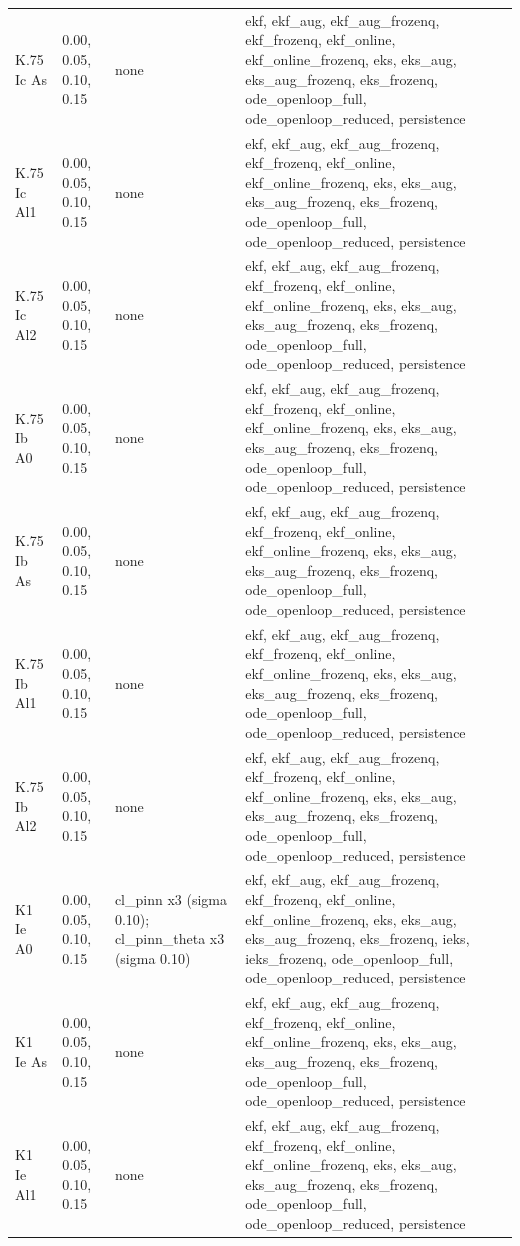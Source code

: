 \begin{table}[t]
\begin{tabular}{llll}
K.75 Ic As & 0.00, 0.05, 0.10, 0.15 & none & ekf, ekf\_aug, ekf\_aug\_frozenq, ekf\_frozenq, ekf\_online, ekf\_online\_frozenq, eks, eks\_aug, eks\_aug\_frozenq, eks\_frozenq, ode\_openloop\_full, ode\_openloop\_reduced, persistence \\
K.75 Ic Al1 & 0.00, 0.05, 0.10, 0.15 & none & ekf, ekf\_aug, ekf\_aug\_frozenq, ekf\_frozenq, ekf\_online, ekf\_online\_frozenq, eks, eks\_aug, eks\_aug\_frozenq, eks\_frozenq, ode\_openloop\_full, ode\_openloop\_reduced, persistence \\
K.75 Ic Al2 & 0.00, 0.05, 0.10, 0.15 & none & ekf, ekf\_aug, ekf\_aug\_frozenq, ekf\_frozenq, ekf\_online, ekf\_online\_frozenq, eks, eks\_aug, eks\_aug\_frozenq, eks\_frozenq, ode\_openloop\_full, ode\_openloop\_reduced, persistence \\
K.75 Ib A0 & 0.00, 0.05, 0.10, 0.15 & none & ekf, ekf\_aug, ekf\_aug\_frozenq, ekf\_frozenq, ekf\_online, ekf\_online\_frozenq, eks, eks\_aug, eks\_aug\_frozenq, eks\_frozenq, ode\_openloop\_full, ode\_openloop\_reduced, persistence \\
K.75 Ib As & 0.00, 0.05, 0.10, 0.15 & none & ekf, ekf\_aug, ekf\_aug\_frozenq, ekf\_frozenq, ekf\_online, ekf\_online\_frozenq, eks, eks\_aug, eks\_aug\_frozenq, eks\_frozenq, ode\_openloop\_full, ode\_openloop\_reduced, persistence \\
K.75 Ib Al1 & 0.00, 0.05, 0.10, 0.15 & none & ekf, ekf\_aug, ekf\_aug\_frozenq, ekf\_frozenq, ekf\_online, ekf\_online\_frozenq, eks, eks\_aug, eks\_aug\_frozenq, eks\_frozenq, ode\_openloop\_full, ode\_openloop\_reduced, persistence \\
K.75 Ib Al2 & 0.00, 0.05, 0.10, 0.15 & none & ekf, ekf\_aug, ekf\_aug\_frozenq, ekf\_frozenq, ekf\_online, ekf\_online\_frozenq, eks, eks\_aug, eks\_aug\_frozenq, eks\_frozenq, ode\_openloop\_full, ode\_openloop\_reduced, persistence \\
K1 Ie A0 & 0.00, 0.05, 0.10, 0.15 & cl\_pinn x3 (sigma 0.10); cl\_pinn\_theta x3 (sigma 0.10) & ekf, ekf\_aug, ekf\_aug\_frozenq, ekf\_frozenq, ekf\_online, ekf\_online\_frozenq, eks, eks\_aug, eks\_aug\_frozenq, eks\_frozenq, ieks, ieks\_frozenq, ode\_openloop\_full, ode\_openloop\_reduced, persistence \\
K1 Ie As & 0.00, 0.05, 0.10, 0.15 & none & ekf, ekf\_aug, ekf\_aug\_frozenq, ekf\_frozenq, ekf\_online, ekf\_online\_frozenq, eks, eks\_aug, eks\_aug\_frozenq, eks\_frozenq, ode\_openloop\_full, ode\_openloop\_reduced, persistence \\
K1 Ie Al1 & 0.00, 0.05, 0.10, 0.15 & none & ekf, ekf\_aug, ekf\_aug\_frozenq, ekf\_frozenq, ekf\_online, ekf\_online\_frozenq, eks, eks\_aug, eks\_aug\_frozenq, eks\_frozenq, ode\_openloop\_full, ode\_openloop\_reduced, persistence \\

\end{tabular}
\end{table}
